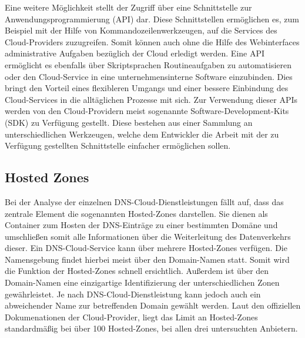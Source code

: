 Eine weitere Möglichkeit stellt der Zugriff über eine Schnittstelle zur Anwendungsprogrammierung (API) dar. Diese Schnittstellen ermöglichen es, zum Beispiel mit der Hilfe von Kommandozeilenwerkzeugen, auf die Services des Cloud-Providers zuzugreifen. Somit können auch ohne die Hilfe des Webinterfaces administrative Aufgaben bezüglich der Cloud erledigt werden. Eine API ermöglicht es ebenfalls über Skriptsprachen Routineaufgaben zu automatisieren oder den Cloud-Service in eine unternehmensinterne Software einzubinden. Dies bringt den Vorteil eines flexibleren Umgangs und einer bessere Einbindung des Cloud-Services in die alltäglichen Prozesse mit sich. Zur Verwendung dieser APIs werden von den Cloud-Providern meist sogenannte Software-Development-Kits (SDK) zu Verfügung gestellt. Diese bestehen aus einer Sammlung an unterschiedlichen Werkzeugen, welche dem Entwickler die Arbeit mit der zu Verfügung gestellten Schnittstelle einfacher ermöglichen sollen.

 \subsection{Hosted Zones}
Bei der Analyse der einzelnen DNS-Cloud-Dienstleistungen fällt auf, dass das zentrale Element die sogenannten Hosted-Zones darstellen. Sie dienen als Container zum Hosten der DNS-Einträge zu einer bestimmten Domäne und umschließen somit alle Informationen über die Weiterleitung des Datenverkehrs dieser.
Ein DNS-Cloud-Service kann über mehrere Hosted-Zones verfügen. Die Namensgebung findet hierbei meist über den Domain-Namen statt. Somit wird die Funktion der Hosted-Zones schnell ersichtlich. Außerdem ist über den Domain-Namen eine einzigartige Identifizierung der unterschiedlichen Zonen gewährleistet. Je nach DNS-Cloud-Dienstleistung kann jedoch auch ein abweichender Name zur betreffenden Domain gewählt werden. Laut den offiziellen Dokumenationen der Cloud-Provider, liegt das Limit an Hosted-Zones standardmäßig bei über 100 Hosted-Zones, bei allen drei untersuchten Anbietern.

